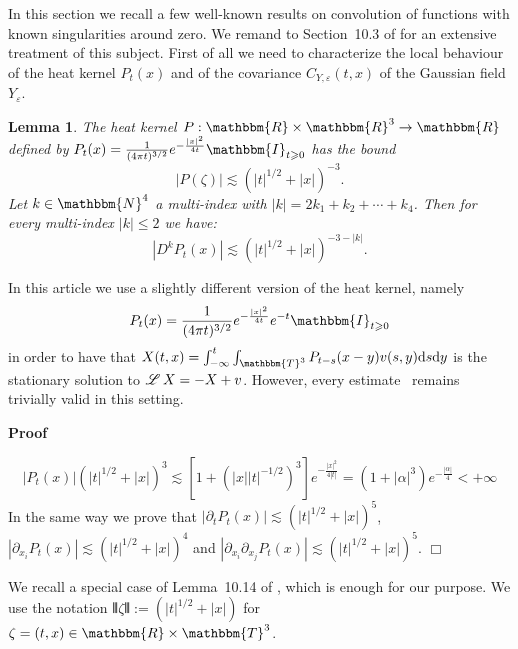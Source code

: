 \documentclass[a4paper,11pt]{article}
\newcommand{\assign}{:=}
\newcommand{\mathd}{\mathrm{d}}
\newcommand{\mathpi}{\pi}
\newenvironment{proof}{\noindent\textbf{Proof\ }}{\hspace*{\fill}$\Box$\medskip}
\newtheorem{lemma}[theorem]{Lemma}
{\theorembodyfont{\rmfamily}\newtheorem{remark}[theorem]{Remark}}
\newcommand{\LL}{\mathscr{L} \hspace{.2em}}
\begin{document}
In this section we recall a few well-known results on convolution of functions
with known singularities around zero. We remand to Section~10.3 of
{\cite{hairer_theory_2014}} for an extensive treatment of this subject. First
of all we need to characterize the local behaviour of the heat kernel $P_t
(x)$ and of the covariance $C_{Y, \varepsilon} (t, x)$ of the Gaussian field
$Y_{\varepsilon}$.

\begin{lemma}
  \label{l:heat-est} The heat kernel $P : \mathbbm{R} \times \mathbbm{R}^3
  \rightarrow \mathbbm{R}$ defined by $P_t (x) = \frac{1}{(4 \mathpi t)^{3 /
  2}} e^{- \frac{| x |^2}{4 t}} \mathbbm{I}_{t \geqslant 0}$ has the bound
  \[ | P (\zeta) | \lesssim (| t |^{1 / 2} + | x |)^{- 3} . \]
  Let $k \in \mathbbm{N}^4$ a multi-index with $| k | = 2 k_1 + k_2 + \cdots +
  k_4$. Then for every multi-index $| k | \leqslant 2$ we have:
  \[ | D^k P_t (x) | \lesssim (| t |^{1 / 2} + | x |)^{- 3 - | k |} . \]
\end{lemma}

\begin{remark}
  In this article we use a slightly different version of the heat kernel,
  namely
  \[ P_t (x) = \frac{1}{(4 \mathpi t)^{3 / 2}} e^{- \frac{| x |^2}{4 t}} e^{-
     t} \mathbbm{I}_{t \geqslant 0} \]
  in order to have that $X (t, x) = \int_{- \infty}^t \int_{\mathbbm{T}^3}
  P_{t - s} (x - y) v (s, y) \mathd s \mathd y$ is the stationary solution to
  $\LL X = - X + v$. However, every estimate \ remains trivially valid in this
  setting.
\end{remark}

\begin{proof}
  
  \[ | P_t (x) | (| t |^{1 / 2} + | x |)^3 \lesssim [1 + (| x | | t |^{- 1 /
     2})^3] e^{- \frac{| x |^2}{4 | t |}} = (1 + | \alpha |^3) e^{- \frac{|
     \alpha |}{4}} < + \infty \]
  In the same way we prove that $| \partial_t P_t (x) | \lesssim (| t |^{1 /
  2} + | x |)^5$, $| \partial_{x_i} P_t (x) | \lesssim (| t |^{1 / 2} + | x
  |)^4$ and $| \partial_{x_i} \partial_{x_j} P_t (x) | \lesssim (| t |^{1 / 2}
  + | x |)^5$.
\end{proof}

We recall a special case of Lemma~10.14 of {\cite{hairer_theory_2014}}, which
is enough for our purpose. We use the notation $\interleave \zeta \interleave
\assign (| t |^{1 / 2} + | x |)$ for $\zeta = (t, x) \in \mathbbm{R} \times
\mathbbm{T}^3$.
\end{document}
